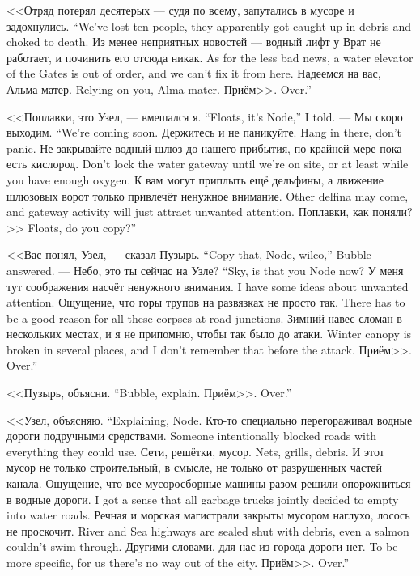 {<<Отряд потерял десятерых --- судя по всему, запутались в мусоре и задохнулись.}
{``We've lost ten people, they apparently got caught up in debris and choked to death.}
{Из менее неприятных новостей --- водный лифт у Врат не работает, и починить его отсюда никак.}
{As for the less bad news, a water elevator of the Gates is out of order, and we can't fix it from here.}
{Надеемся на вас, Альма-матер.}
{Relying on you, Alma mater.}
{Приём>>.}
{Over.''}

{<<Поплавки, это Узел, --- вмешался я.}
{``Floats, it's Node,'' I told.}
{--- Мы скоро выходим.}
{``We're coming soon.}
{Держитесь и не паникуйте.}
{Hang in there, don't panic.}
{Не закрывайте водный шлюз до нашего прибытия, по крайней мере пока есть кислород.}
{Don't lock the water gateway until we're on site, or at least while you have enough oxygen.}
{К вам могут приплыть ещё дельфины, а движение шлюзовых ворот только привлечёт ненужное внимание.}
{Other delfina may come, and gateway activity will just attract unwanted attention.}
{Поплавки, как поняли?>>}
{Floats, do you copy?''}

{<<Вас понял, Узел, --- сказал Пузырь.}
{``Copy that, Node, wilco,'' Bubble answered.}
{--- Небо, это ты сейчас на Узле?}
{``Sky, is that you Node now?}
{У меня тут соображения насчёт ненужного внимания.}
{I have some ideas about unwanted attention.}
{Ощущение, что горы трупов на развязках не просто так.}
{There has to be a good reason for all these corpses at road junctions.}
{Зимний навес сломан в нескольких местах, и я не припомню, чтобы так было до атаки.}
{Winter canopy is broken in several places, and I don't remember that before the attack.}
{Приём>>.}
{Over.''}

{<<Пузырь, объясни.}
{``Bubble, explain.}
{Приём>>.}
{Over.''}

{<<Узел, объясняю.}
{``Explaining, Node.}
{Кто-то специально перегораживал водные дороги подручными средствами.}
{Someone intentionally blocked roads with everything they could use.}
{Сети, решётки, мусор.}
{Nets, grills, debris.}
И этот мусор не только строительный, в смысле, не только от разрушенных частей канала.
{Ощущение, что все мусоросборные машины разом решили опорожниться в водные дороги.}
{I got a sense that all garbage trucks jointly decided to empty into water roads.}
{Речная и морская магистрали закрыты мусором наглухо, лосось не проскочит.}
{River and Sea highways are sealed shut with debris, even a salmon couldn't swim through.}
{Другими словами, для нас из города дороги нет.}
{To be more specific, for us there's no way out of the city.}
{Приём>>.}
{Over.''}

